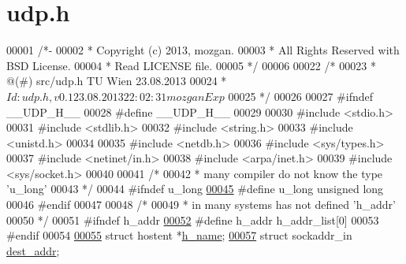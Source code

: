 \hypertarget{udp_8h_source}{\section{udp.\+h}
\label{udp_8h_source}
}

\begin{DoxyCode}
00001 \textcolor{comment}{/*-}
00002 \textcolor{comment}{ * Copyright (c) 2013, mozgan.}
00003 \textcolor{comment}{ * All Rights Reserved with BSD License.}
00004 \textcolor{comment}{ * Read LICENSE file.}
00005 \textcolor{comment}{ */}
00006 
00022 \textcolor{comment}{/*}
00023 \textcolor{comment}{ *      @(#) src/udp.h          TU Wien 23.08.2013}
00024 \textcolor{comment}{ *  $Id: udp.h,v 0.1 23.08.2013 22:02:31 mozgan Exp $}
00025 \textcolor{comment}{ */}
00026 
00027 \textcolor{preprocessor}{#ifndef \_\_UDP\_H\_\_}
00028 \textcolor{preprocessor}{#define \_\_UDP\_H\_\_}
00029 
00030 \textcolor{preprocessor}{#include <stdio.h>}
00031 \textcolor{preprocessor}{#include <stdlib.h>}
00032 \textcolor{preprocessor}{#include <string.h>}
00033 \textcolor{preprocessor}{#include <unistd.h>}
00034 
00035 \textcolor{preprocessor}{#include <netdb.h>}
00036 \textcolor{preprocessor}{#include <sys/types.h>}
00037 \textcolor{preprocessor}{#include <netinet/in.h>}
00038 \textcolor{preprocessor}{#include <arpa/inet.h>}
00039 \textcolor{preprocessor}{#include <sys/socket.h>}
00040 
00041 \textcolor{comment}{/*}
00042 \textcolor{comment}{ * many compiler do not know the type 'u\_long'}
00043 \textcolor{comment}{ */}
00044 \textcolor{preprocessor}{#ifndef u\_long}
\hypertarget{udp_8h_source_l00045}{}\hyperlink{udp_8h_aaf12d2783d89167480b76853da8ba5e1}{00045} \textcolor{preprocessor}{#define u\_long  unsigned long}
00046 \textcolor{preprocessor}{#endif}
00047 
00048 \textcolor{comment}{/*}
00049 \textcolor{comment}{ * in many systems has not defined 'h\_addr'}
00050 \textcolor{comment}{ */}
00051 \textcolor{preprocessor}{#ifndef h\_addr}
\hypertarget{udp_8h_source_l00052}{}\hyperlink{udp_8h_a4d04a8261523c8f3473946257c12ce5b}{00052} \textcolor{preprocessor}{#define h\_addr h\_addr\_list[0]}
00053 \textcolor{preprocessor}{#endif}
00054 
\hypertarget{udp_8h_source_l00055}{}\hyperlink{udp_8h_aecc6f69775dc6fdfbfde27f60b417932}{00055} \textcolor{keyword}{struct }hostent *\hyperlink{udp_8h_aecc6f69775dc6fdfbfde27f60b417932}{h\_name};                   
\hypertarget{udp_8h_source_l00057}{}\hyperlink{udp_8h_a072220ecebc8a6044aca4afa78eefebd}{00057} \textcolor{keyword}{struct }sockaddr\_in \hyperlink{udp_8h_a072220ecebc8a6044aca4afa78eefebd}{dest\_addr};          

\end{DoxyCode}
